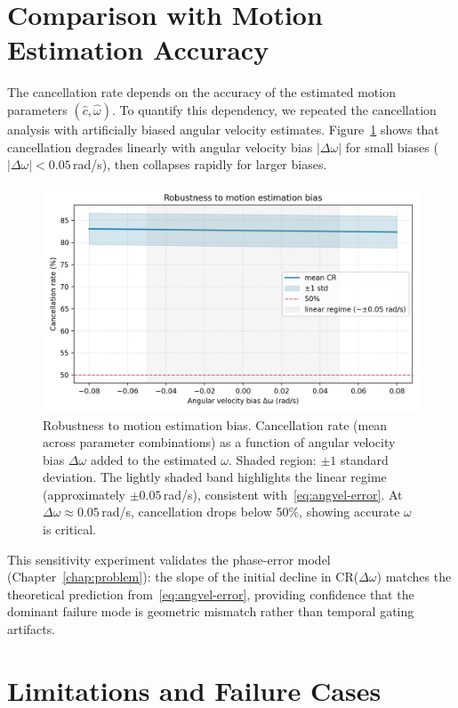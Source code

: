 \section{Comparison with Motion Estimation Accuracy}

The cancellation rate depends on the accuracy of the estimated motion parameters $(\hat c,\hat\omega)$. To quantify this dependency, we repeated the cancellation analysis with artificially biased angular velocity estimates. Figure~\ref{fig:bias_sensitivity} shows that cancellation degrades linearly with angular velocity bias $|\Delta\omega|$ for small biases ($|\Delta\omega| < 0.05$\,rad/s), then collapses rapidly for larger biases.

\begin{figure}[t]
  \centering
  \includegraphics[width=0.85\linewidth]{images/main_results/bias_sensitivity.png}
  \caption{Robustness to motion estimation bias. Cancellation rate (mean across parameter combinations) as a function of angular velocity bias $\Delta\omega$ added to the estimated $\omega$. Shaded region: $\pm 1$ standard deviation. The lightly shaded band highlights the linear regime (approximately $\pm 0.05$\,rad/s), consistent with~\eqref{eq:angvel-error}. At $\Delta\omega \approx 0.05$\,rad/s, cancellation drops below 50\%, showing accurate $\omega$ is critical.}
  \label{fig:bias_sensitivity}
\end{figure}

This sensitivity experiment validates the phase-error model (Chapter~\ref{chap:problem}): the slope of the initial decline in CR($\Delta\omega$) matches the theoretical prediction from~\eqref{eq:angvel-error}, providing confidence that the dominant failure mode is geometric mismatch rather than temporal gating artifacts.

\section{Limitations and Failure Cases}

